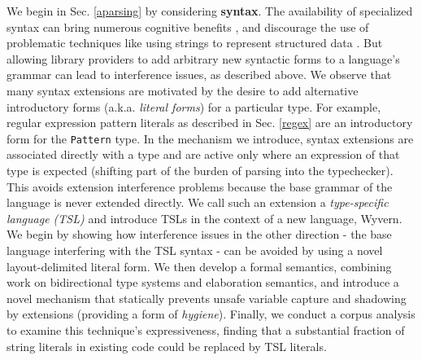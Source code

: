 We begin in Sec. \ref{aparsing} by considering \textbf{syntax}. The availability of specialized syntax can bring numerous cognitive benefits \cite{green1996usability}, and discourage the use of problematic techniques like using strings to represent structured data \cite{Bravenboer:2007:PIA:1289971.1289975}. But allowing library providers to add arbitrary new syntactic forms to a language's grammar can lead to interference issues, as described above. We observe that many syntax extensions are motivated by the desire to add alternative  introductory forms (a.k.a. \emph{literal forms}) for a particular type. For example, regular expression pattern literals as described in Sec. \ref{regex} are an introductory form for the \verb|Pattern| type.  In the mechanism we introduce, syntax extensions are associated directly with a type and are active only where an expression of that type is expected (shifting part of the burden of parsing into the typechecker). This avoids extension interference problems because the base grammar of the language is never extended directly. We call such an extension a \emph{type-specific language (TSL)} and introduce TSLs in the context of a new language, Wyvern. We begin by showing how interference issues in the other direction - the base language interfering with  the TSL syntax - can be avoided by using a novel layout-delimited literal form. We then develop a formal semantics, combining work on bidirectional type systems and elaboration semantics, and introduce a novel mechanism that statically prevents unsafe variable capture and shadowing by extensions (providing a form of \emph{hygiene}). Finally, we conduct a corpus analysis to examine this technique's expressiveness, finding that a substantial fraction of string literals in existing code could be replaced by TSL literals.


